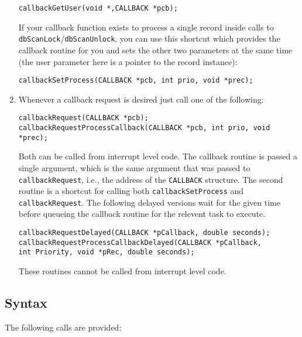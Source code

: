 \begin{enumerate}
\begin{verbatim}
callbackGetUser(void *,CALLBACK *pcb);
\end{verbatim}

If your callback function exists to process a single record inside calls to \verb|dbScanLock|/\verb|dbScanUnlock|, you can use this shortcut which provides the callback routine for you and sets the other two parameters at the same time 
(the user parameter here is a pointer to the record instance):

\begin{verbatim}
callbackSetProcess(CALLBACK *pcb, int prio, void *prec);
\end{verbatim}

\item Whenever a callback request is desired just call one of the following:

\begin{verbatim}
callbackRequest(CALLBACK *pcb);
callbackRequestProcessCallback(CALLBACK *pcb, int prio, void *prec);
\end{verbatim}

Both can be called from interrupt level code. The callback routine is passed a single argument, which is the same 
argument that was passed to \verb|callbackRequest|, i.e., the address of the \verb|CALLBACK| structure. The second 
routine is a shortcut for calling both \verb|callbackSetProcess| and \verb|callbackRequest|. The following delayed 
versions wait for the given time before queueing the callback routine for the relevent task to execute.

\begin{verbatim}
callbackRequestDelayed(CALLBACK *pCallback, double seconds);
callbackRequestProcessCallbackDelayed(CALLBACK *pCallback,
int Priority, void *pRec, double seconds);
\end{verbatim}

These routines cannot be called from interrupt level code.

\end{enumerate}

\subsection{Syntax}

The following calls are provided:

